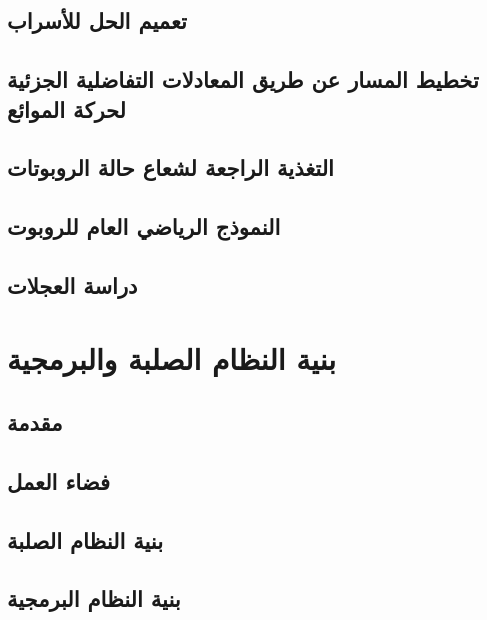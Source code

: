 \documentclass[10pt,a4paper]{book}
\begin{document}
	
	
	\section{تعميم الحل للأسراب}
	
	
	
	\section{تخطيط المسار عن طريق المعادلات التفاضلية الجزئية لحركة الموائع}
	
	
	
	\section{التغذية الراجعة لشعاع حالة الروبوتات}
	
	
	\section{النموذج الرياضي العام للروبوت}
	
	
	
	\section{دراسة العجلات}
	
	
	\chapter{بنية النظام الصلبة والبرمجية}
	
	\section{مقدمة}
	
	
	\section{فضاء العمل}
	
	
	\section{بنية النظام الصلبة}
	
	
	\section{بنية النظام البرمجية}
	
\end{document}
